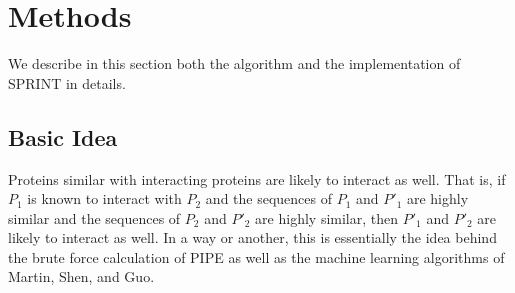



\section{Methods}
We describe in this section both the algorithm and the implementation of SPRINT in details.
\subsection{Basic Idea}
Proteins similar with interacting proteins are likely to interact as well. That is, if $P_1$ is known to interact with $P_2$ and the sequences of $P_1$ and $P'_1$ are highly similar and the sequences of $P_2$ and $P'_2$ are highly similar, then $P'_1$ and $P'_2$ are likely to interact as well. In a way or another, this is essentially the idea behind the brute force calculation of PIPE as well as the machine learning algorithms of Martin, Shen, and Guo. 

